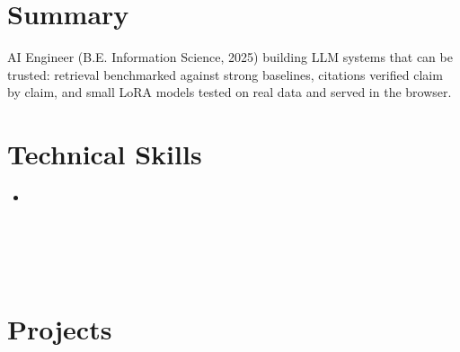






\section{Summary}
\small{AI Engineer (B.E. Information Science, 2025) building LLM systems that can be trusted: retrieval benchmarked against strong baselines, citations verified claim by claim, and small LoRA models tested on real data and served in the browser.}

\section{Technical Skills}
 \begin{itemize}[leftmargin=0.15in, label={}]
    \item \small{
     \skillLLM \\
     \skillEval \\
     \skillMLOps \\
     \skillML \\
     \skillLang \\
     \skillData
    }
 \end{itemize}
 \vspace{-14pt}



\section{Projects}
  \resumeSubHeadingListStart

    

    

    

    

    

  \resumeSubHeadingListEnd






